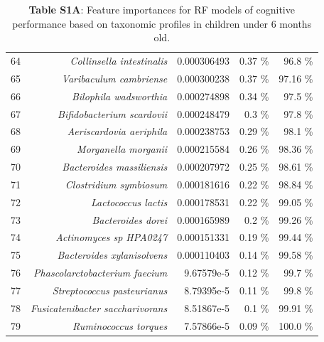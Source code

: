 \documentclass{article}
\begin{document}
\begin{table}[h]
\begin{centering}
\begin{tabular}{|r|r|r|r|r|}
      64 & \textit{Collinsella intestinalis} & 0.000306493 & 0.37 \% & 96.8 \% \\
      65 & \textit{Varibaculum cambriense} & 0.000300238 & 0.37 \% & 97.16 \% \\
      66 & \textit{Bilophila wadsworthia} & 0.000274898 & 0.34 \% & 97.5 \% \\
      67 & \textit{Bifidobacterium scardovii} & 0.000248479 & 0.3 \% & 97.8 \% \\
      68 & \textit{Aeriscardovia aeriphila} & 0.000238753 & 0.29 \% & 98.1 \% \\
      69 & \textit{Morganella morganii} & 0.000215584 & 0.26 \% & 98.36 \% \\
      70 & \textit{Bacteroides massiliensis} & 0.000207972 & 0.25 \% & 98.61 \% \\
      71 & \textit{Clostridium symbiosum} & 0.000181616 & 0.22 \% & 98.84 \% \\
      72 & \textit{Lactococcus lactis} & 0.000178531 & 0.22 \% & 99.05 \% \\
      73 & \textit{Bacteroides dorei} & 0.000165989 & 0.2 \% & 99.26 \% \\
      74 & \textit{Actinomyces sp HPA0247} & 0.000151331 & 0.19 \% & 99.44 \% \\
      75 & \textit{Bacteroides xylanisolvens} & 0.000110403 & 0.14 \% & 99.58 \% \\
      76 & \textit{Phascolarctobacterium faecium} & 9.67579e-5 & 0.12 \% & 99.7 \% \\
      77 & \textit{Streptococcus pasteurianus} & 8.79395e-5 & 0.11 \% & 99.8 \% \\
      78 & \textit{Fusicatenibacter saccharivorans} & 8.51867e-5 & 0.1 \% & 99.91 \% \\
      79 & \textit{Ruminococcus torques} & 7.57866e-5 & 0.09 \% & 100.0 \% \\\hline\hline
    \end{tabular}
    \caption*{
        \textbf{Table S1A}: Feature importances for RF models of cognitive performance
        based on taxonomic profiles in children under 6 months old.
    }
    \end{centering}
  \end{table}
\end{document}
